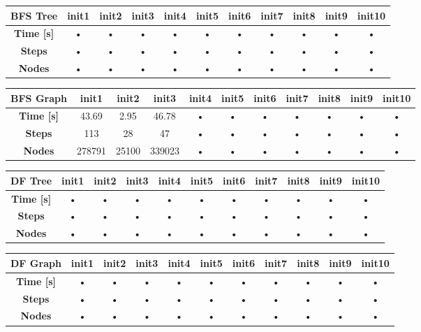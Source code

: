 \documentclass[a4paper,10pt]{article}
\begin{document}
	\begin{tabular}{|c|c|c|c|c|c|c|c|c|c|c|}
		\hline 
		\textbf{BFS Tree} & \textbf{init1} & \textbf{init2} & \textbf{init3} & \textbf{init4} & \textbf{init5} & \textbf{init6} & \textbf{init7} & \textbf{init8} & \textbf{init9} & \textbf{init10} \\ 
		\hline 
		\textbf{Time [s]} & • & • & • & • & • & • & • & • & • & • \\ 
		\hline 
		\textbf{Steps} & • & • & • & • & • & • & • & • & • & • \\ 
		\hline 
		\textbf{Nodes} & • & • & • & • & • & • & • & • & • & • \\ 
		\hline 
	\end{tabular} 
	
	\begin{tabular}{|c|c|c|c|c|c|c|c|c|c|c|}
		\hline 
		\textbf{BFS Graph} & \textbf{init1} & \textbf{init2} & \textbf{init3} & \textbf{init4} & \textbf{init5} & \textbf{init6} & \textbf{init7} & \textbf{init8} & \textbf{init9} & \textbf{init10} \\ 
		\hline 
		\textbf{Time [s]} & 43.69 & 2.95 & 46.78 & • & • & • & • & • & • & • \\ 
		\hline 
		\textbf{Steps} & 113 & 28 & 47 & • & • & • & • & • & • & • \\ 
		\hline 
		\textbf{Nodes} & 278791 & 25100 & 339023 & • & • & • & • & • & • & • \\ 
		\hline 
	\end{tabular} 
	
	\begin{tabular}{|c|c|c|c|c|c|c|c|c|c|c|}
		\hline 
		\textbf{DF Tree} & \textbf{init1} & \textbf{init2} & \textbf{init3} & \textbf{init4} & \textbf{init5} & \textbf{init6} & \textbf{init7} & \textbf{init8} & \textbf{init9} & \textbf{init10} \\ 
		\hline 
		\textbf{Time [s]} & • & • & • & • & • & • & • & • & • & • \\ 
		\hline 
		\textbf{Steps} & • & • & • & • & • & • & • & • & • & • \\ 
		\hline 
		\textbf{Nodes} & • & • & • & • & • & • & • & • & • & • \\ 
		\hline 
	\end{tabular} 
	
	\begin{tabular}{|c|c|c|c|c|c|c|c|c|c|c|}
		\hline 
		\textbf{DF Graph} & \textbf{init1} & \textbf{init2} & \textbf{init3} & \textbf{init4} & \textbf{init5} & \textbf{init6} & \textbf{init7} & \textbf{init8} & \textbf{init9} & \textbf{init10} \\ 
		\hline 
		\textbf{Time [s]} & • & • & • & • & • & • & • & • & • & • \\ 
		\hline 
		\textbf{Steps} & • & • & • & • & • & • & • & • & • & • \\ 
		\hline 
		\textbf{Nodes} & • & • & • & • & • & • & • & • & • & • \\ 
		\hline 
	\end{tabular} 	
	
\end{document}
